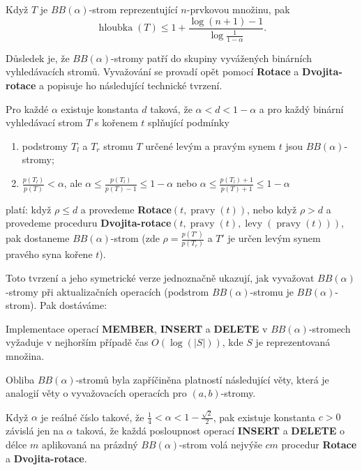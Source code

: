\documentclass[a4paper,12pt]{article}
\DeclareMathOperator*{\levy}{levy}
\DeclareMathOperator*{\pravy}{pravy}
\DeclareMathOperator*{\hloubka}{hloubka}
\begin{document}
\begin{tvrzeni}Když $T$ je $BB(\alpha )$-strom reprezentující 
$n$-prvkovou množinu, pak 
$$\hloubka(T)\le 1+\frac {\log(n+1)-1}{\log\frac 1{1-\alpha}}.$$
\end{tvrzeni}

Důsledek je, že $BB(\alpha )$-stromy patří do 
skupiny vyvážených binárních vyhledávacích 
stro\-mů.  Vyvažování se provadí opět pomocí 
{\bf Rotace} a {\bf Dvojita-rotace} a popisuje ho následu\-jí\-cí 
technické tvrzení. 

\begin{tvrzeni}Pro každé $\alpha$ existuje konstanta $
d$ 
taková, že $\alpha <d<1-\alpha$ a pro každý binární vyhledávací 
strom $T$ s kořenem $t$ splňující podmínky
\begin{enumerate}
\item
podstromy $T_l$ a $T_r$ stromu $T$ určené levým a pravým 
synem $t$ jsou $BB(\alpha )$-stromy;
\item
$\frac {p(T_l)}{p(T)}<\alpha$, ale $\alpha\le\frac {
p(T_l)}{p(T)-1}\le 1-\alpha$ nebo $\alpha\le\frac {
p(T_l)+1}{p(T)+1}\le 1-\alpha$
\end{enumerate}
platí:\newline 
když $\rho\le d$ a provedeme {\bf Rotace$(t,\pravy(t))$}, nebo když 
$\rho >d$ a provedeme proceduru {\bf Dvojita-rotace$(t,\pravy(t),\levy(\pravy(t)))$}, pak dostaneme 
$BB(\alpha )$-strom (zde $\rho =\frac {p(T')}{p(T_r
)}$ a $T'$ je určen levým synem 
pravé\-ho syna kořene $t$).  
\end{tvrzeni}

Toto tvrzení a jeho symetrické verze jednoznačně ukazují, 
jak vyvažovat $BB(\alpha )$-stromy při aktualizačních 
operacích (podstrom $BB(\alpha )$-stromu je $BB(\alpha )$-strom). Pak dostáváme:

\begin{veta}Implementace operací {\bf MEMBER}, {\bf INSERT} a {\bf DELETE }v $BB(\alpha )$-stromech vyžaduje v nejhorším 
případě čas $O(\log(|S|))$, kde $S$ je 
reprezentovaná množina.
\end{veta}

Obliba $BB(\alpha )$-stromů byla zapříčiněna 
platností následující věty, která je analogií věty o 
vyvažovacích operacích pro $(a,b)$-stromy.

\begin{veta}Když $\alpha$ je reálné číslo takové, že 
$\frac 14<\alpha <1-\frac {\sqrt 2}2$, pak existuje konstanta $c>
0$ závislá jen na 
$\alpha$ taková, že každá posloupnost operací {\bf INSERT} a {\bf DELETE }
o délce $m$ aplikovaná na prázdný $BB(\alpha )$-strom volá 
nejvýše $cm$ procedur {\bf Rotace} a {\bf Dvojita-rotace}.
\end{veta}
\end{document}
